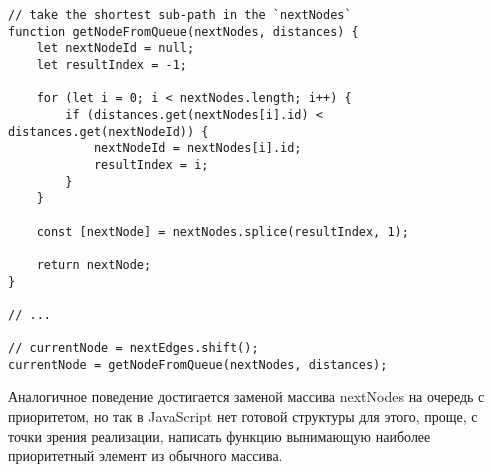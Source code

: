 \documentclass[../article.tex]{subfiles}
\begin{document}
\begin{figure*}
    \begin{ruledelement}
        \begin{lstlisting}[caption={Отличие алгоритма дейкстры}, label={lst:dijkstraDiffBfs}]
// take the shortest sub-path in the `nextNodes`
function getNodeFromQueue(nextNodes, distances) {
    let nextNodeId = null;
    let resultIndex = -1;

    for (let i = 0; i < nextNodes.length; i++) {
        if (distances.get(nextNodes[i].id) < distances.get(nextNodeId)) {
            nextNodeId = nextNodes[i].id;
            resultIndex = i;
        }
    }

    const [nextNode] = nextNodes.splice(resultIndex, 1);

    return nextNode;
}

// ...

// currentNode = nextEdges.shift();
currentNode = getNodeFromQueue(nextNodes, distances);
        \end{lstlisting}
    \end{ruledelement}
\end{figure*}

Аналогичное поведение достигается заменой массива nextNodes на очередь с приоритетом, но так в JavaScript нет готовой структуры для этого, проще, с точки зрения реализации, написать функцию вынимающую наиболее приоритетный элемент из обычного массива.
\end{document}
